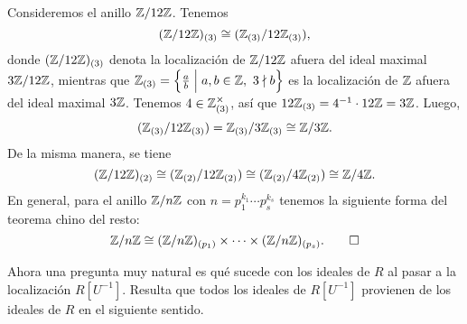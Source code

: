 \begin{ejemplo}
  Consideremos el anillo $\mathbb{Z}/12\mathbb{Z}$. Tenemos
  $$(\mathbb{Z}/12\mathbb{Z})_{(3)} \cong (\mathbb{Z}_{(3)}/12\mathbb{Z}_{(3)}),$$
  donde $(\mathbb{Z}/12\mathbb{Z})_{(3)}$ denota la localización de $\mathbb{Z}/12\mathbb{Z}$ afuera
  del ideal maximal $3\mathbb{Z}/12\mathbb{Z}$, mientras que
  $\mathbb{Z}_{(3)} = \Bigl\{ \frac{a}{b} \Bigm| a,b \in \mathbb{Z}, ~ 3\nmid b \Bigr\}$
  es la localización de $\mathbb{Z}$ afuera del ideal maximal $3\mathbb{Z}$. Tenemos
  $4 \in \mathbb{Z}_{(3)}^\times$, así que $12\mathbb{Z}_{(3)} = 4^{-1}\cdot 12\mathbb{Z} = 3\mathbb{Z}$.
  Luego,
  $$(\mathbb{Z}_{(3)}/12\mathbb{Z}_{(3)}) = \mathbb{Z}_{(3)}/3\mathbb{Z}_{(3)} \cong \mathbb{Z}/3\mathbb{Z}.$$
  De la misma manera, se tiene
  \[ (\mathbb{Z}/12\mathbb{Z})_{(2)} \cong
     (\mathbb{Z}_{(2)}/12\mathbb{Z}_{(2)}) \cong
     (\mathbb{Z}_{(2)}/4\mathbb{Z}_{(2)}) \cong \mathbb{Z}/4\mathbb{Z}. \]
  En general, para el anillo $\mathbb{Z}/n\mathbb{Z}$ con $n = p_1^{k_1}\cdots p_s^{k_s}$
  tenemos la siguiente forma del teorema chino del resto:
  \[ \mathbb{Z}/n\mathbb{Z} \cong (\mathbb{Z}/n\mathbb{Z})_{(p_1)}\times\cdots\times(\mathbb{Z}/n\mathbb{Z})_{(p_s)}. \qedhere \]
\end{ejemplo}

Ahora una pregunta muy natural es qué sucede con los ideales de $R$ al pasar
a la localización $R [U^{-1}]$. Resulta que todos los ideales de $R [U^{-1}]$
provienen de los ideales de $R$ en el siguiente sentido.

